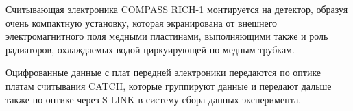 Считывающая электроника COMPASS \mbox{RICH-1} монтируется на детектор, образуя очень компактную установку, которая экранирована от внешнего электромагнитного поля медными пластинами, выполняющими также и роль радиаторов, охлаждаемых водой циркуирующей по медным трубкам.


Оцифрованные данные с плат передней электроники передаются по оптике платам считывания CATCH, которые группируют данные и передают дальше также по оптике через S-LINK в систему сбора данных эксперимента.




